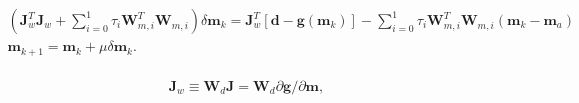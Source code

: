 \[\begin{gathered}
  \left( {{\mathbf{J}}_w^T{\mathbf{ J}}_w^{} + \sum\limits_{i = 0}^1 {{\tau _i}} {\mathbf{W}}_{m,i}^T{\mathbf{W}}_{m,i}^{}} \right)\delta {{\mathbf{m}}_k} = {\mathbf{J}}_w^T\left[ {{\mathbf{d}} - {\mathbf{g}}({{\mathbf{m}}_k})} \right] - \sum\limits_{i = 0}^1 {{\tau _i}} {\mathbf{W}}_{m,i}^T{\mathbf{W}}_{m,i}^{}({{\mathbf{m}}_k} - {{\mathbf{m}}_a})\quad  \\ 
  {{\mathbf{m}}_{k + 1}} = {{\mathbf{m}}_k} + \mu \delta {{\mathbf{m}}_k}. \\ 
\end{gathered} \]%



\[{{\mathbf{J}}_w} \equiv {{\mathbf{W}}_d}{\mathbf{J}} = {{\mathbf{W}}_d}\partial {\mathbf{g}}/\partial {\mathbf{m}},\quad \]%

